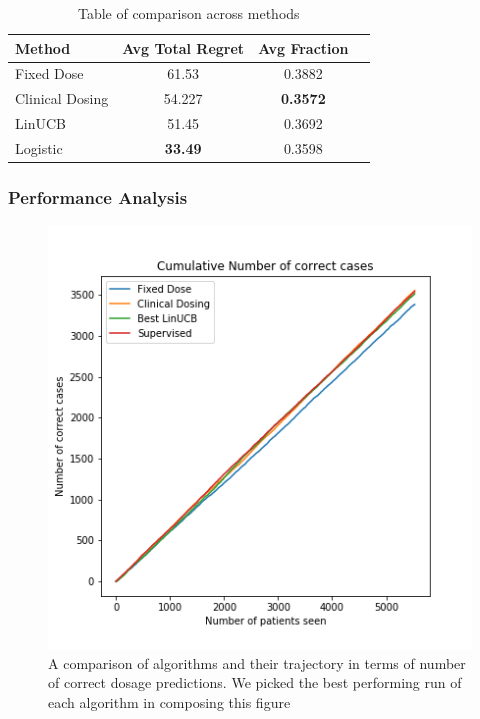 \documentclass{article}
\begin{document}
\begin{table}[t]
	\caption{Table of comparison across methods}
	\label{table:comparison}
	\vskip 0.15in
	\begin{center}
		\begin{small}
			\begin{sc}
				\begin{tabular}{lccc}
					\toprule
					Method          & Avg Total Regret & Avg Fraction    \\
					\midrule
					Fixed Dose      & 61.53            & 0.3882          \\
					Clinical Dosing & 54.227           & \textbf{0.3572} \\
					LinUCB          & 51.45            & 0.3692          \\
					Logistic        & \textbf{33.49}   & 0.3598    	\\
					\bottomrule
				\end{tabular}
			\end{sc}
		\end{small}
	\end{center}
	\vskip -0.1in
\end{table}


\subsubsection{Performance Analysis}
\begin{figure}
	\includegraphics[width=\linewidth]{../plots/comparison.png}
	\caption{A comparison of algorithms and their trajectory in terms of number of correct dosage predictions. We picked the best performing run of each algorithm in composing this figure}
	\label{fig:comparison}
\end{figure}
\end{document}
